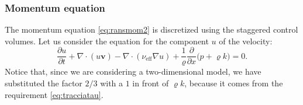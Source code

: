 \subsubsection{Momentum equation}
The momentum equation \eqref{eq:ransmom2} is discretized using the staggered 
control volumes. Let us consider the equation for the component $u$ of the 
velocity:
\begin{equation} \label{eq:stagu}
\frac{\partial u}{\partial t} + \nabla \cdot ( u \mathbf{v}) - \nabla \cdot 
(\nu_\text{eff} \nabla u) + \frac{1}{\varrho} \frac{\partial}{\partial x} 
\big(p 
+ \varrho k\big) = 0.
\end{equation}
Notice that, since we are considering a two-dimensional model, we have 
substituted the factor $2/3$ with a $1$ in front of $\varrho k$, because it 
comes from the requirement \eqref{eq:tracciatau}.

